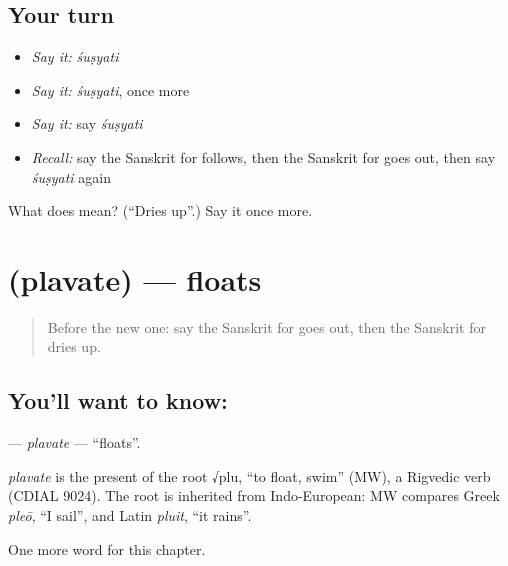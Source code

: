 \subsection*{Your turn}
\begin{itemize}
\raggedright
  \item \emph{Say it:} \emph{śuṣyati}
  \item \emph{Say it:} \emph{śuṣyati}, once more
  \item \emph{Say it:} say \emph{śuṣyati}
  \item \emph{Recall:} say the Sanskrit for follows, then the Sanskrit for goes out, then say \emph{śuṣyati} again
\end{itemize}

\begin{tcolorbox}[breakable,colback=teal!4,colframe=teal!35!black,title={Before you move on}]
What does  mean? (\textquotedblleft{}Dries up\textquotedblright{}.) Say it once more.
\end{tcolorbox}
\section[\texorpdfstring{\sk{प्लवते} (plavate)}{प्लवते (plavate)}]{ (plavate) — floats}

\label{lesson:SA-C234-plavate}



\begin{quote}
Before the new one: say the Sanskrit for goes out, then the Sanskrit for dries up.
\end{quote}

\subsection*{You'll want to know: }
\textbf{} — \emph{plavate} — \textquotedblleft{}floats\textquotedblright{}.

\begin{cousinweb}
\emph{plavate} is the present of the root √plu, \textquotedblleft{}to float, swim\textquotedblright{} (MW), a Rigvedic verb (CDIAL 9024). The root is inherited from Indo-European: MW compares Greek \emph{pleō}, \textquotedblleft{}I sail\textquotedblright{}, and Latin \emph{pluit}, \textquotedblleft{}it rains\textquotedblright{}.
\end{cousinweb}

\begin{grammarlens}[title={What you've built}]
One more word for this chapter.
\end{grammarlens}

